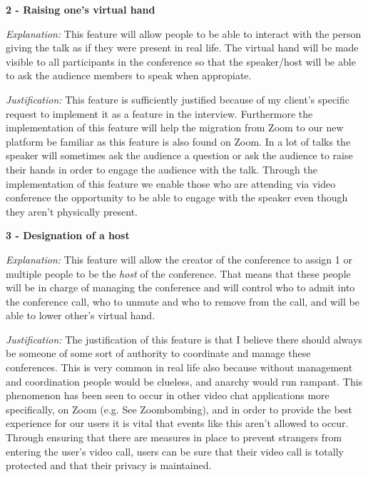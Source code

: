 \vspace{0.2cm}

\textsf{\bfseries 2 - Raising one's virtual hand} \\ \vspace{0.1cm}

\textit{Explanation:} This feature will allow people to be
able to interact with the
person giving the talk as if they were present in real life.
The virtual hand will be made visible to all participants in 
the conference so that the speaker/host will be able to ask 
the audience members to speak when appropiate.\\
\vspace{0.1cm}

\textit{Justification:} This feature
is sufficiently justified because of my client's specific 
request to implement it as a feature in the interview. 
Furthermore the implementation of this feature will help the 
migration from Zoom to our new platform be familiar as this 
feature is also found on Zoom. In a lot of talks the speaker
will sometimes ask the audience a question or ask the audience
to raise their hands in order to engage the audience with the
talk. Through the implementation of this feature we enable 
those who are attending via video conference the opportunity
to be able to engage with the speaker even though they aren't
physically present.

\vspace{0.2cm}

\textsf{\bfseries 3 - Designation of a host} \\ \vspace{0.1cm}

\textit{Explanation:} This feature will allow the creator of
the conference to assign 1 or multiple people to be the 
\textit{host} of the conference. That means that these
people will be in charge of 
managing the conference and will control who to admit into the
conference call, who to unmute and who to remove from the
call, and will be able to lower other's virtual hand. 
\vspace{0.1cm}

\textit{Justification:} The
justification of this feature is that I believe there should 
always be someone of some sort of authority to coordinate and 
manage these conferences. This is very common in real life
also because without management and coordination people
would be clueless, and anarchy would run rampant. This
phenomenon has been seen to occur in other video chat 
applications more specifically, on Zoom 
(e.g. See Zoombombing), and in order to provide the 
best experience for our users it is vital that events like 
this aren't allowed to occur. Through ensuring that there are
measures in place to prevent strangers from entering the
user's video call, users can be sure that their video call is
totally protected and that their privacy is maintained.


